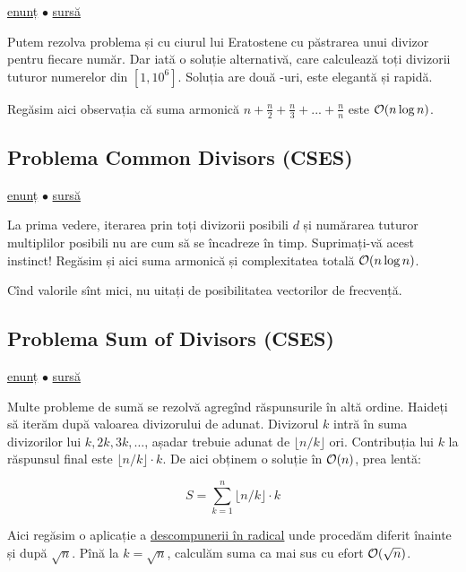 \documentclass[../main.tex]{subfiles}
\begin{document}
\href{https://cses.fi/problemset/task/1713}{enunț}
$\bullet$
\hyperref[code:counting-divisors]{sursă}

Putem rezolva problema și cu ciurul lui Eratostene cu păstrarea unui divizor pentru fiecare număr. Dar iată o soluție alternativă, care calculează toți divizorii tuturor numerelor din $[1, 10^{6}]$. Soluția are două -uri, este elegantă și rapidă.

Regăsim aici observația că suma armonică $n + \frac{n}{2} + \frac{n}{3} + ... + \frac{n}{n}$ este $\mathcal{O}(n \log n)$.


\subsection{Problema Common Divisors (CSES)}
\label{problem:common-divisors}

\href{https://cses.fi/problemset/task/1081}{enunț}
$\bullet$
\hyperref[code:common-divisors]{sursă}

La prima vedere, iterarea prin toți divizorii posibili $d$ și numărarea tuturor multiplilor posibili nu are cum să se încadreze în timp. Suprimați-vă acest instinct!  Regăsim și aici suma armonică și complexitatea totală $\mathcal{O}(n \log n)$.

Cînd valorile sînt mici, nu uitați de posibilitatea vectorilor de frecvență.


\subsection{Problema Sum of Divisors (CSES)}
\label{problem:sum-of-divisors}

\href{https://cses.fi/problemset/task/1082}{enunț}
$\bullet$
\hyperref[code:sum-of-divisors]{sursă}

Multe probleme de sumă se rezolvă agregînd răspunsurile în altă ordine. Haideți să iterăm după valoarea divizorului de adunat. Divizorul $k$ intră în suma divizorilor lui $k, 2k, 3k, \dots$, așadar trebuie adunat de $\lfloor n/k \rfloor$ ori. Contribuția lui $k$ la răspunsul final este $\lfloor n/k \rfloor \cdot k$. De aici obținem o soluție în $\mathcal{O}(n)$, prea lentă:

$$S = \sum_{k=1}^{n} \lfloor n/k \rfloor \cdot k$$

Aici regăsim o aplicație a \hyperref[sec:sqrt-split]{descompunerii în radical} unde procedăm diferit înainte și după $\sqrt{n}$. Pînă la $k = \sqrt{n}$, calculăm suma ca mai sus cu efort $\mathcal{O}(\sqrt{n})$.
\end{document}
